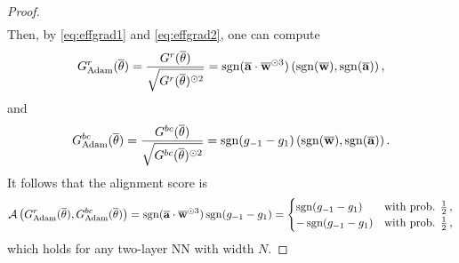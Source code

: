 \begin{proof}
\begin{align*}
\end{align*}
Then, by \eqref{eq:effgrad1} and \eqref{eq:effgrad2}, one can compute 
\begin{align*}
    G^r_{\rm Adam}(\overline{\theta}) = \frac{G^r(\overline{\theta})}{\sqrt{G^r(\overline{\theta})^{\odot 2}}} = \operatorname{sgn}(\overline{\mathbf{a}} \cdot \overline{\mathbf{w}}^{\odot 3})\left(\operatorname{sgn}(\overline{\mathbf{w}}),\operatorname{sgn}(\overline{\mathbf{a}}) \right),
\end{align*}
and 
\begin{align*}
    G^{bc}_{\rm Adam}(\overline{\theta}) = \frac{G^{bc}(\overline{\theta})}{\sqrt{G^{bc}(\overline{\theta})^{\odot 2}}} = \operatorname{sgn}(g_{-1} - g_1)\left(\operatorname{sgn}(\overline{\mathbf{w}}),\operatorname{sgn}(\overline{\mathbf{a}}) \right).
\end{align*}
It follows that the  alignment score is 
\begin{align*}
    \mathcal{A}\left( G^r_{\rm Adam}(\overline{\theta}) , G^{bc}_{\rm Adam}(\overline{\theta})  \right)  = \operatorname{sgn}(\overline{\mathbf{a}} \cdot \overline{\mathbf{w}}^{\odot 3}) \operatorname{sgn}(g_{-1} - g_1) =  \begin{cases}
        \operatorname{sgn} (g_{-1} - g_1)  & \text{with prob. $\frac{1}{2}$}\,, \\
       - \operatorname{sgn} (g_{-1} - g_1) & \text{with prob. $\frac{1}{2}$}\,,
      \end{cases}
\end{align*}
which holds for any two-layer NN with width $N$. 



\end{proof}
